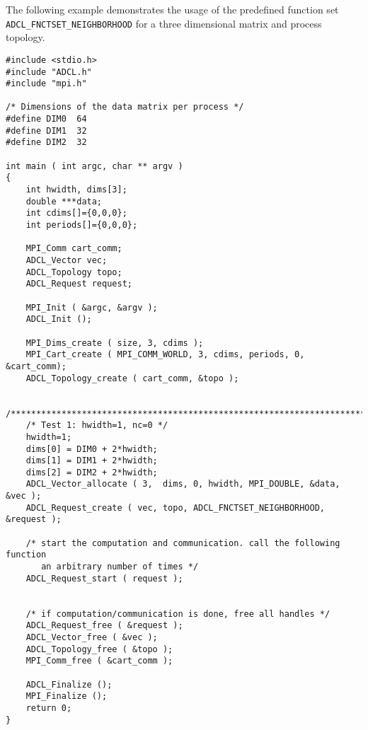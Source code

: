 The following example demonstrates the usage of the predefined function set {\tt ADCL\_FNCTSET\_NEIGHBORHOOD} for a three dimensional matrix and process topology.

\begin{verbatim}
#include <stdio.h>
#include "ADCL.h"
#include "mpi.h"

/* Dimensions of the data matrix per process */
#define DIM0  64
#define DIM1  32
#define DIM2  32

int main ( int argc, char ** argv ) 
{
    int hwidth, dims[3];
    double ***data;
    int cdims[]={0,0,0};
    int periods[]={0,0,0};
    
    MPI_Comm cart_comm;
    ADCL_Vector vec;
    ADCL_Topology topo;
    ADCL_Request request;

    MPI_Init ( &argc, &argv );
    ADCL_Init ();
    
    MPI_Dims_create ( size, 3, cdims );
    MPI_Cart_create ( MPI_COMM_WORLD, 3, cdims, periods, 0, &cart_comm);
    ADCL_Topology_create ( cart_comm, &topo );

    /**********************************************************************/
    /* Test 1: hwidth=1, nc=0 */
    hwidth=1;
    dims[0] = DIM0 + 2*hwidth;
    dims[1] = DIM1 + 2*hwidth;
    dims[2] = DIM2 + 2*hwidth;
    ADCL_Vector_allocate ( 3,  dims, 0, hwidth, MPI_DOUBLE, &data, &vec );
    ADCL_Request_create ( vec, topo, ADCL_FNCTSET_NEIGHBORHOOD, &request );
    
    /* start the computation and communication. call the following function
       an arbitrary number of times */ 
    ADCL_Request_start ( request );


    /* if computation/communication is done, free all handles */
    ADCL_Request_free ( &request );
    ADCL_Vector_free ( &vec );
    ADCL_Topology_free ( &topo );
    MPI_Comm_free ( &cart_comm );
    
    ADCL_Finalize ();
    MPI_Finalize ();
    return 0;
}
\end{verbatim}